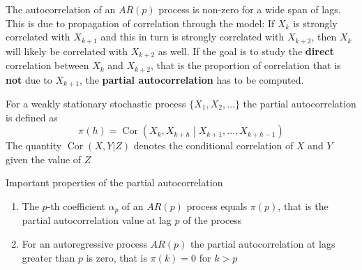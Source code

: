 \documentclass[11pt]{article}
\newcommand*\Cor[1]{\mathop{\text{Cor}}\left(#1\right)}
\begin{document}
The autocorrelation of an $AR(p)$ process is non-zero for a wide span of lags. This is due to propagation of correlation through the model: If $X_k$ is strongly correlated with $X_{k+1}$ and this in turn is strongly correlated with $X_{k+2}$, then $X_k$ will likely be correlated with $X_{k+2}$ as well. If the goal is to study the \textbf{direct} correlation between $X_k$ and $X_{k+2}$, that is the proportion of correlation that is \textbf{not} due to $X_{k+1}$, the \textbf{partial autocorrelation} has to be computed.

\begin{definition}
	For a weakly stationary stochastic process $\{X_1,X_2,\dots\}$ the partial autocorrelation is defined as
	\begin{equation*}
		\pi(h) = \Cor{X_k,X_{k+h}\middle|X_{k+1},\dots,X_{k+h-1}}
	\end{equation*}
	The quantity $\Cor{X,Y|Z}$ denotes the conditional correlation of $X$ and $Y$ given the value of $Z$
\end{definition}
Important properties of the partial autocorrelation
\begin{enumerate}
	\item The $p$-th coefficient $\alpha_p$ of an $AR(p)$ process equals $\pi(p)$, that is the partial autocorrelation value at lag $p$ of the process
	\item For an autoregressive process $AR(p)$ the partial autocorrelation at lags greater than $p$ is zero, that is $\pi(k) = 0$ for $k>p$
\end{enumerate}
\end{document}
